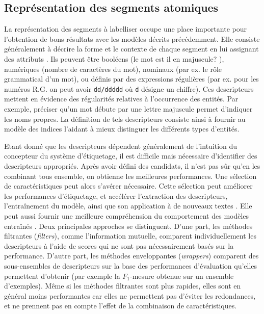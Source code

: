 \subsection{Représentation des segments atomiques}

La représentation des segments à labelliser occupe une place importante pour l'obtention de bons résultats avec les modèles décrits précédemment. Elle consiste généralement à décrire la forme et le contexte de chaque segment en lui assignant des attributs \citep{nadeau2007nersurvey,sharnagat2014nersurvey}. Ils peuvent être booléens (\og le mot est il en majuscule? \fg{}), numériques (nombre de caractères du mot), nominaux (par ex. le rôle grammatical d'un mot), ou définis par des expressions régulières (par ex. pour les numéros R.G. on peut avoir \verb|dd/ddddd| où \verb|d| désigne un chiffre). Ces descripteurs mettent  en évidence des régularités relatives à l'occurrence des entités. Par exemple, préciser qu'un mot débute par une lettre majuscule permet d'indiquer les noms propres. La définition de tels descripteurs consiste ainsi à fournir au modèle des indices l'aidant à mieux distinguer les différents types d'entités. 

Etant donné que les descripteurs dépendent généralement de l'intuition du concepteur du système d'étiquetage, il est difficile mais nécessaire d'identifier des descripteurs appropriés. Après avoir défini des candidats, il n'est pas sûr qu'en les combinant tous ensemble, on obtienne les meilleures performances. Une sélection de caractéristiques peut alors s'avérer nécessaire. Cette sélection peut améliorer les performances d'étiquetage, et accélérer l'extraction des descripteurs, l'entraînement du modèle, ainsi que son application à de nouveaux textes \citep{kitoogo2007featureSelectNER}. Elle peut aussi fournir une meilleure compréhension du comportement des modèles entraînés \citep{klinger2009FeaturefilterCRF}. Deux principales approches se distinguent. D'une part, les méthodes \og filtrantes \fg{} (\textit{filters}), comme l'information mutuelle, comparent individuellement les descripteurs à l'aide de scores qui ne sont pas nécessairement basés sur la performance. D'autre part, les méthodes \og enveloppantes \fg{} (\textit{wrappers}) comparent des sous-ensembles de descripteurs sur la base des performances d'évaluation qu'elles permettent d'obtenir (par exemple la $F_1$-mesure obtenue sur un ensemble d'exemples). Même si les méthodes filtrantes sont plus rapides, elles sont en général moins performantes car elles ne permettent pas d'éviter les redondances, et ne prennent pas en compte l'effet de la combinaison de caractéristiques.

